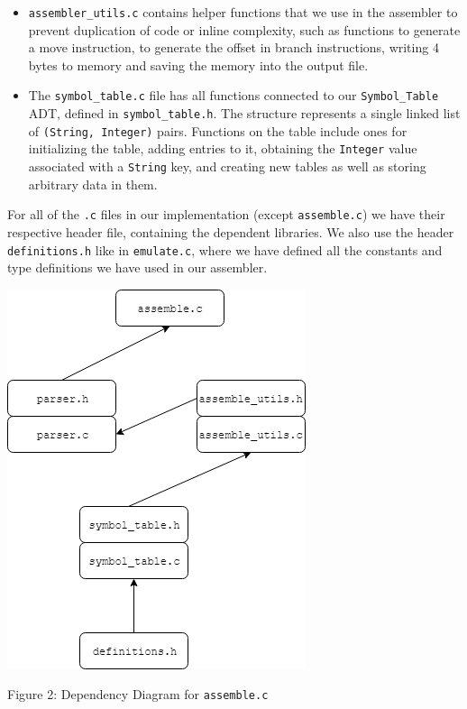 \documentclass[11pt]{article}
\begin{document}
\begin{minipage}{0.6\linewidth}
    \begin{itemize}
    \item \texttt{assembler\_utils.c} contains helper functions that we use in the assembler to prevent duplication of code or inline complexity, such as functions to generate a move instruction, to generate the offset in branch instructions, writing 4 bytes to memory and saving the memory into the output file.
    \item The \texttt{symbol\_table.c} file has all functions connected to our \texttt{Symbol\_Table} ADT, defined in \texttt{symbol\_table.h}. The structure represents a single linked list of \texttt{(String, Integer)} pairs. Functions on the table include ones for initializing the table, adding entries to it, obtaining the \texttt{Integer} value associated with a \texttt{String} key, and creating new tables as well as storing arbitrary data in them.
\end{itemize}
\par For all of the \texttt{.c} files in our implementation (except \texttt{assemble.c}) we have their respective header file, containing the dependent libraries. We also use the header \texttt{definitions.h} like in \texttt{emulate.c}, where we have defined all the constants and type definitions we have used in our assembler.
\end{minipage}
\hspace{0.05\linewidth}
\begin{minipage}{0.35\linewidth}

\centering
\includegraphics[scale=0.8]{diagrams/AssemblerDependencies.png}
\caption{Figure 2: Dependency Diagram for \texttt{assemble.c}}

\end{minipage}
\end{document}
